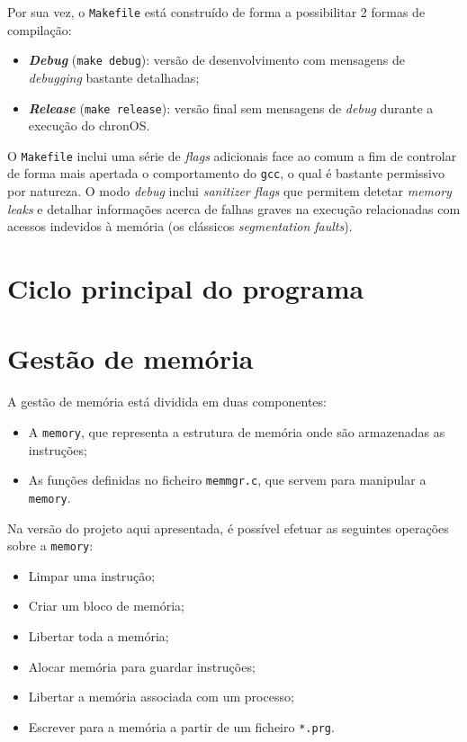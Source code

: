 \documentclass[a4paper,11pt,onecolumn,oneside]{article}
\newcommand{\chronOS}{\textsf{chronOS}}
\begin{document}
	Por sua vez, o \texttt{Makefile} está construído de forma a possibilitar 2 formas de compilação:
	
	\begin{itemize}
		\item \textbf{\textit{Debug}} (\verb|make debug|): versão de desenvolvimento com mensagens de \textit{debugging} bastante detalhadas;
		
		\item \textbf{\textit{Release}} (\verb|make release|): versão final sem mensagens de \textit{debug} durante a execução do \chronOS.
	\end{itemize}

	O \texttt{Makefile} inclui uma série de \textit{flags} adicionais face ao comum a fim de controlar de forma mais apertada o comportamento do \texttt{gcc}, o qual é bastante permissivo por natureza. O modo \textit{debug} inclui \textit{sanitizer flags} que permitem detetar \textit{memory leaks} e detalhar informações acerca de falhas graves na execução relacionadas com acessos indevidos à memória (os clássicos \textit{segmentation faults}).
	
	
	\section{Ciclo principal do programa}
	\label{sec:main}
	
	
	\section{Gestão de memória}
	\label{sec:memory}
	A gestão de memória está dividida em duas componentes:
	\begin{itemize}
	    \item A \verb|memory|, que representa a estrutura de memória onde são armazenadas as instruções;
	    \item As funções definidas no ficheiro \verb|memmgr.c|, que servem para manipular a \verb|memory|.
	\end{itemize}
	
	Na versão do projeto aqui apresentada, é possível efetuar as seguintes operações sobre a \verb|memory|:
	    \begin{itemize}
	        \item Limpar uma instrução;
	        \item Criar um bloco de memória;
	        \item Libertar toda a memória;
	        \item Alocar memória para guardar instruções;
	        \item Libertar a memória associada com um processo;
	        \item Escrever para a memória a partir de um ficheiro \verb|*.prg|.
	    \end{itemize}
\end{document}
